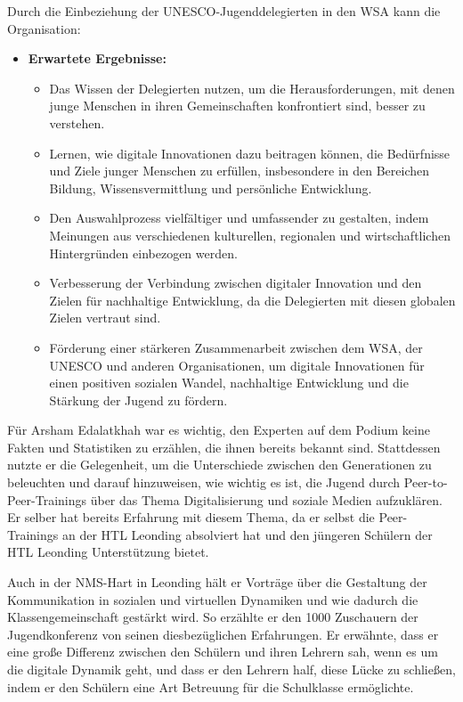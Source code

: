 Durch die Einbeziehung der UNESCO-Jugenddelegierten in den WSA kann die Organisation:

\begin{itemize}
    \item \textbf{Erwartete Ergebnisse:}
    \begin{itemize}
        \item {Das Wissen der Delegierten nutzen, um die Herausforderungen, mit denen junge Menschen in ihren Gemeinschaften konfrontiert sind, besser zu verstehen.}
        \item {Lernen, wie digitale Innovationen dazu beitragen können, die Bedürfnisse und Ziele junger Menschen zu erfüllen, insbesondere in den Bereichen Bildung, Wissensvermittlung und persönliche Entwicklung.}
        \item {Den Auswahlprozess vielfältiger und umfassender zu gestalten, indem Meinungen aus verschiedenen kulturellen, regionalen und wirtschaftlichen Hintergründen einbezogen werden.}
        \item {Verbesserung der Verbindung zwischen digitaler Innovation und den Zielen für nachhaltige Entwicklung, da die Delegierten mit diesen globalen Zielen vertraut sind.}
        \item {Förderung einer stärkeren Zusammenarbeit zwischen dem WSA, der UNESCO und anderen Organisationen, um digitale Innovationen für einen positiven sozialen Wandel, nachhaltige Entwicklung und die Stärkung der Jugend zu fördern.}
    \end{itemize}
\end{itemize}


Für Arsham Edalatkhah war es wichtig, den Experten auf dem Podium keine Fakten und Statistiken zu erzählen, die ihnen bereits bekannt sind. Stattdessen nutzte er die Gelegenheit, um die Unterschiede zwischen den Generationen zu beleuchten und darauf hinzuweisen, wie wichtig es ist, die Jugend durch Peer-to-Peer-Trainings über das Thema Digitalisierung und soziale Medien aufzuklären. Er selber hat bereits Erfahrung mit diesem Thema, da er selbst die Peer-Trainings an der HTL Leonding absolviert hat und den jüngeren Schülern der HTL Leonding Unterstützung bietet. 

Auch in der NMS-Hart in Leonding hält er Vorträge über die Gestaltung der Kommunikation in sozialen und virtuellen Dynamiken und wie dadurch die Klassengemeinschaft gestärkt wird. So erzählte er den 1000 Zuschauern der Jugendkonferenz von seinen diesbezüglichen Erfahrungen. Er erwähnte, dass er eine große Differenz zwischen den Schülern und ihren Lehrern sah, wenn es um die digitale Dynamik geht, und dass er den Lehrern half, diese Lücke zu schließen, indem er den Schülern eine Art Betreuung für die Schulklasse ermöglichte.

